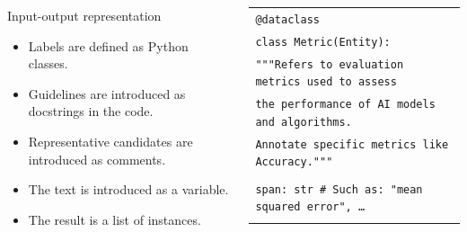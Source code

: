 \documentclass[
    11pt,
    notheorems,
    xcolor={dvipsnames},
    hyperref={
        pdfstartview=FitH, 
        pdftitle={Ikasketa-adibide urriko Informazio-Erauzketa}, 
        pdfauthor={Oscar Sainz Jimenez}, 
        citecolor=secondary, 
    }
]{beamer}
\begin{document}
\begin{frame}
    \begin{columns}
        \begin{column}{0.35\textwidth}
            \begin{block}{Input-output representation}
                \begin{itemize}
                    \item Labels are defined as Python classes.
                    \item Guidelines are introduced as docstrings in the code.
                    \item Representative candidates are introduced as comments.
                    \item The text is introduced as a variable.
                    \item The result is a list of instances.
                \end{itemize}
            \end{block}
        \end{column}
        \begin{column}{0.6\textwidth}
            \begin{table}
                \centering
                \begin{tabular}{p{\textwidth}}
                    \texttt{\textcolor{github-purple}{@dataclass}}                                                                                                    \\
                    \texttt{\textcolor{github-red}{class} \textcolor{github-dark-red}{Metric}(\textcolor{github-dark-red}{Entity}):}                                  \\
                    \texttt{\textcolor{github-blue}{\quad """Refers to evaluation metrics used to assess}}                                                            \\
                    \texttt{\textcolor{github-blue}{\quad the performance of AI models and algorithms.}}                                                              \\
                    \texttt{\textcolor{github-blue}{\quad Annotate specific metrics like Accuracy."""}}                                                               \\
                    \\
                    \texttt{\quad span: str  \textcolor{github-gray}{\# Such as: "mean squared error",  …}}                                                           \\ \\

\end{tabular}
\end{table}
\end{column}
\end{columns}
\end{frame}
\end{document}
